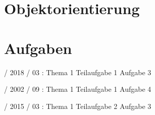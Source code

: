 \documentclass{lehramt-informatik}
\begin{document}

\chapter{Objektorientierung}


\chapter{Aufgaben}

 / 2018 / 03 : Thema 1 Teilaufgabe 1 Aufgabe 3

%

 / 2002 / 09 : Thema 1 Teilaufgabe 1 Aufgabe 4

%

 / 2015 / 03 : Thema 1 Teilaufgabe 2 Aufgabe 3

\literatur
\end{document}
